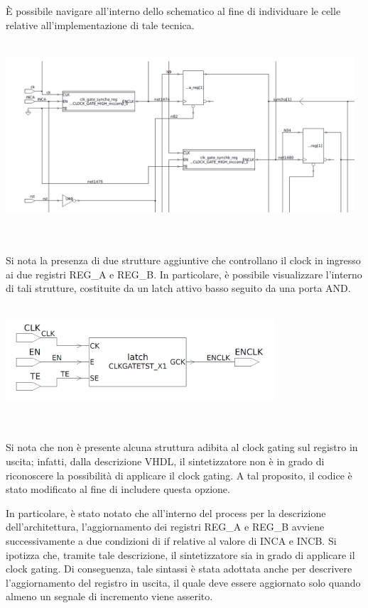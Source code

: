 \documentclass[11pt,  english, makeidx, a4paper, titlepage, oneside]{book}
\newenvironment{listato}{\footnotesize} {\normalsize }
\begin{document}
\vspace{0.3cm}          
È possibile navigare all'interno dello schematico al fine di individuare le celle relative all'implementazione di tale tecnica.        
\\\\
\centerline{\includegraphics[width=13cm]{./img/Lab_3/clock_gating_cells.png}}
\\\\
Si nota la presenza di due strutture aggiuntive che controllano il clock in ingresso ai due registri REG\_A e REG\_B. In particolare, è possibile visualizzare l'interno di tali strutture, costituite da un latch attivo basso seguito da una porta AND.
\\\\
\centerline{\includegraphics[width=10cm]{./img/Lab_3/clock_gating_implementation.png}}
\\\\       
Si nota che non è presente alcuna struttura adibita al clock gating sul registro in uscita; infatti, dalla descrizione VHDL, il sintetizzatore non è in grado di riconoscere la possibilità di applicare il clock gating. A tal proposito, il codice è stato modificato al fine di includere questa opzione.
\begin{center}
\begin{listato}
	\centerline{}
\end{listato}
\end{center}
In particolare, è stato notato che all'interno del process per la descrizione dell'architettura, l'aggiornamento dei registri REG\_A e REG\_B avviene successivamente a due condizioni di if relative al valore di INCA e INCB. Si ipotizza che, tramite tale descrizione, il sintetizzatore sia in grado di applicare il clock gating. Di conseguenza, tale sintassi è stata adottata anche per descrivere l'aggiornamento del registro in uscita, il quale deve essere aggiornato solo quando almeno un segnale di incremento viene asserito.
\end{document}
